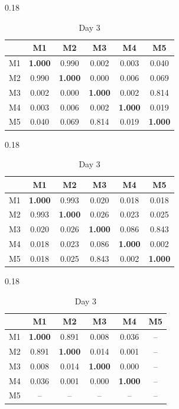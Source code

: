 \begin{table}[htbp]
\centering
\caption{Within-day MAC matrices between the three tracked modes.}
\label{tab:mac_within}
\begin{subtable}[t]{0.18\linewidth}
\centering
\caption*{Day 1}
\begin{tabular}{cccccc}
\toprule
& M1 & M2 & M3 & M4 & M5 \\
\midrule
M1 & \textbf{1.000} & 0.990 & 0.002 & 0.003 & 0.040 \\
M2 & 0.990 & \textbf{1.000} & 0.000 & 0.006 & 0.069 \\
M3 & 0.002 & 0.000 & \textbf{1.000} & 0.002 & 0.814 \\
M4 & 0.003 & 0.006 & 0.002 & \textbf{1.000} & 0.019 \\
M5 & 0.040 & 0.069 & 0.814 & 0.019 & \textbf{1.000} \\
\bottomrule
\end{tabular}
\end{subtable}
\hfill
\begin{subtable}[t]{0.18\linewidth}
\centering
\caption*{Day 2}
\begin{tabular}{cccccc}
\toprule
& M1 & M2 & M3 & M4 & M5 \\
\midrule
M1 & \textbf{1.000} & 0.993 & 0.020 & 0.018 & 0.018 \\
M2 & 0.993 & \textbf{1.000} & 0.026 & 0.023 & 0.025 \\
M3 & 0.020 & 0.026 & \textbf{1.000} & 0.086 & 0.843 \\
M4 & 0.018 & 0.023 & 0.086 & \textbf{1.000} & 0.002 \\
M5 & 0.018 & 0.025 & 0.843 & 0.002 & \textbf{1.000} \\
\bottomrule
\end{tabular}
\end{subtable}
\hfill
\begin{subtable}[t]{0.18\linewidth}
\centering
\caption*{Day 3}
\begin{tabular}{cccccc}
\toprule
& M1 & M2 & M3 & M4 & M5 \\
\midrule
M1 & \textbf{1.000} & 0.891 & 0.008 & 0.036 & -- \\
M2 & 0.891 & \textbf{1.000} & 0.014 & 0.001 & -- \\
M3 & 0.008 & 0.014 & \textbf{1.000} & 0.000 & -- \\
M4 & 0.036 & 0.001 & 0.000 & \textbf{1.000} & -- \\
M5 & -- & -- & -- & -- & -- \\
\bottomrule
\end{tabular}

\end{subtable}
\end{table}
